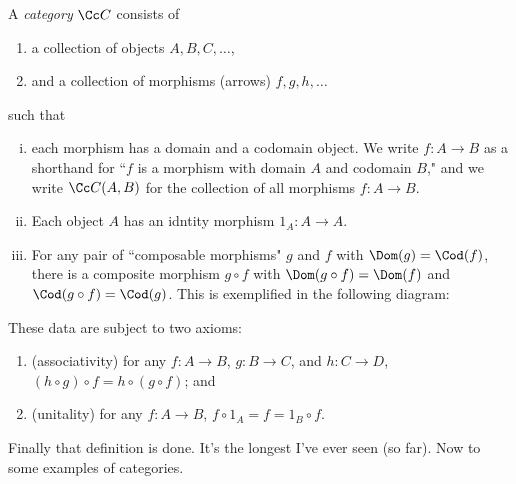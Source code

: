 \documentclass[class=article, crop=false]{standalone}
\begin{document}
\begin{defn}
  A \emph{category} $\Cc C$ consists of
    \begin{enumerate}[(1)]
      \item a collection of objects $A,B,C, \ldots$,
      \item and a collection of morphisms (arrows) $f,g,h,\ldots$
    \end{enumerate}
  such that
    \begin{enumerate}[(i)]
      \item each morphism has a domain and a codomain object. We write $f\colon A \to B$ as a shorthand for ``$f$ is a morphism with domain $A$ and codomain $B$," and we write $\Cc C(A,B)$ for the collection of all morphisms $f\colon A \to B$.

      \item Each object $A$ has an idntity morphism $1_A\colon A \to A$.
      \item For any pair of ``composable morphisms" $g$ and $f$ with $\Dom(g) = \Cod(f)$, there is a composite morphism $g \circ f$ with $\Dom(g \circ f) = \Dom(f)$ and $\Cod(g \circ f) = \Cod(g)$. This is exemplified in the following diagram:
    \end{enumerate}

    \begin{center}
    \end{center}

  These data are subject to two axioms:
    \begin{enumerate}[(C1)]
      \item (associativity) for any $f\colon A \to B$, $g\colon B \to C$, and $h\colon C \to D$, $(h \circ g) \circ f = h \circ (g \circ f)$; and
      \item (unitality) for any $f\colon A \to B$, $f \circ 1_A = f = 1_B \circ f$.
    \end{enumerate}
\end{defn}

Finally that definition is done. It's the longest I've ever seen (so far). Now to some examples of categories.
\end{document}
